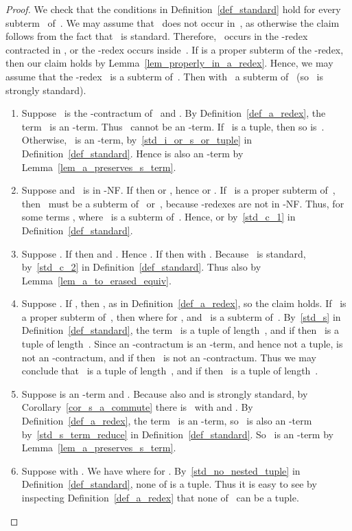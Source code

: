 \documentclass[a4paper,UKenglish]{lipics-v2016}
\begin{document}
\begin{proof}
  We check that the conditions in Definition~\ref{def_standard} hold
  for every subterm~ of~. We may assume that~ does not
  occur in~, as otherwise the claim follows from the fact that~
  is standard. Therefore,~ occurs in the -redex contracted in
  , or the -redex occurs inside~. If  is a
  proper subterm of the -redex, then our claim holds by
  Lemma~\ref{lem_properly_in_a_redex}. Hence, we may assume that the
  -redex~ is a subterm of~. Then  with~ a
  subterm of~ (so~ is strongly standard).
  \begin{enumerate}
  \item Suppose~ is the -contractum of~ and . By Definition~\ref{def_a_redex}, the term~ is an
    -term. Thus~ cannot be an -term. If~ is a tuple, then
    so is~. Otherwise,~ is an -term,
    by~\ref{std_i_or_s_or_tuple} in
    Definition~\ref{def_standard}. Hence  is also an -term by
    Lemma~\ref{lem_a_preserves_s_term}.
  \item Suppose  and~ is in
    -NF. If  then 
    or , hence  or
    . If~ is a proper subterm of~,
    then~ must be a subterm of~ or~, because
    -redexes are not in -NF. Thus,
     for some terms ,
    where~ is a subterm of~. Hence,  or
     by~\ref{std_c_1} in
    Definition~\ref{def_standard}.
  \item Suppose . If 
    then  and . Hence
    . If
     then  with
    . Because~ is standard,
     by~\ref{std_c_2} in
    Definition~\ref{def_standard}. Thus also
     by
    Lemma~\ref{lem_a_to_erased_equiv}.
  \item Suppose . If
    , then
    , as in
    Definition~\ref{def_a_redex}, so the claim holds. If~ is a
    proper subterm of~, then
     where 
    for , and~ is a subterm of~. By~\ref{std_s} in
    Definition~\ref{def_standard}, the term~ is a tuple of
    length~, and if  then~ is a tuple of
    length~. Since an -contractum is an -term, and hence not
    a tuple,  is not an -contractum, and if  then~
    is not an -contractum. Thus we may conclude that~ is a
    tuple of length~, and if  then~ is a
    tuple of length~.
  \item Suppose  is an -term and . Because
    also  and  is strongly standard, by
    Corollary~\ref{cor_s_a_commute} there is~ with
     and . By
    Definition~\ref{def_a_redex}, the term~ is an -term,
    so~ is also an -term by~\ref{std_s_term_reduce} in
    Definition~\ref{def_standard}. So~ is an -term by
    Lemma~\ref{lem_a_preserves_s_term}.
  \item Suppose  with . We
    have  where  for
    . By~\ref{std_no_nested_tuple} in
    Definition~\ref{def_standard}, none of  is a
    tuple. Thus it is easy to see by inspecting
    Definition~\ref{def_a_redex} that none of~ can
    be a tuple.
  \end{enumerate}
\end{proof}
\end{document}
